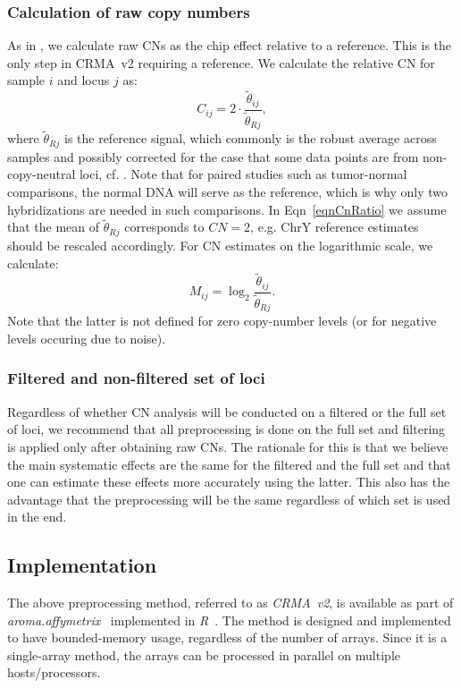 \documentclass{bioinfo}
\newcommand{\pkg}[1]{\textit{#1}\xspace}
\newcommand{\CN}{CN\xspace}
\begin{document}
\subsubsection{Calculation of raw copy numbers}
\label{secRawCN}
As in \citet{BengtssonH_etal_2008a}, we calculate raw CNs as the chip effect relative to a reference.  This is the only step in CRMA~v2 requiring a reference.
We calculate the relative \CN for sample $i$ and locus $j$ as:
\begin{equation}
  C_{ij} = 2 \cdot \frac{\tilde\theta_{ij}}{\tilde\theta_{Rj}},
  \label{eqnCnRatio}
\end{equation}
where $\tilde\theta_{Rj}$ is the reference signal, which commonly is the robust average across samples and possibly corrected for the case that some data points are from non-copy-neutral loci, cf. \citet{BengtssonH_etal_2008a}.
Note that for paired studies such as tumor-normal comparisons, the normal DNA will serve as the reference, which is why only two hybridizations are needed in such comparisons.
In Eqn~\eqref{eqnCnRatio} we assume that the mean of $\tilde\theta_{Rj}$ corresponds to $\CN=2$, e.g. ChrY reference estimates should be rescaled accordingly.
For \CN estimates on the logarithmic scale, we calculate:
\begin{equation}
  M_{ij} = \log_2 \frac{\tilde\theta_{ij}}{\tilde\theta_{Rj}}.
  \label{eqnCnLogRatio}
\end{equation}
Note that the latter is not defined for zero copy-number levels (or for negative levels occuring due to noise).


\subsubsection{Filtered and non-filtered set of loci}
Regardless of whether CN analysis will be conducted on a filtered or the full set of loci, we recommend that all preprocessing is done on the full set and filtering is applied only after obtaining raw CNs.  %
The rationale for this is that we believe the main systematic effects are the same for the filtered and the full set and that one can estimate these effects more accurately using the latter.
This also has the advantage that the preprocessing will be the same regardless of which set is used in the end.


\subsection{Implementation}
The above preprocessing method, referred to as \emph{CRMA~v2}, is available as part of \pkg{aroma.affymetrix}~\citep{BengtssonH_etal_2008b} implemented in \pkg{R}~\citep{RDevel_2008}.
The method is designed and implemented to have bounded-memory usage, regardless of the number of arrays.
Since it is a single-array method, the arrays can be processed in parallel on multiple hosts/processors.
\end{document}
